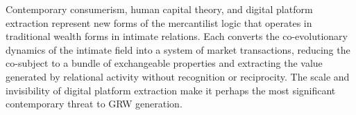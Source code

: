 \begin{claim}
Contemporary consumerism, human capital theory, and digital platform extraction represent new forms of the mercantilist logic that operates in traditional wealth forms in intimate relations. Each converts the co-evolutionary dynamics of the intimate field into a system of market transactions, reducing the co-subject to a bundle of exchangeable properties and extracting the value generated by relational activity without recognition or reciprocity. The scale and invisibility of digital platform extraction make it perhaps the most significant contemporary threat to GRW generation.
\end{claim}
